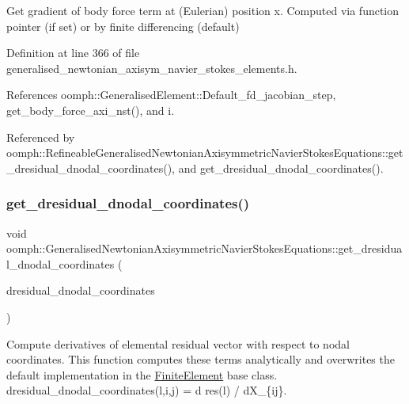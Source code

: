 Get gradient of body force term at (Eulerian) position x. Computed via function pointer (if set) or by finite differencing (default) 



Definition at line 366 of file generalised\+\_\+newtonian\+\_\+axisym\+\_\+navier\+\_\+stokes\+\_\+elements.\+h.



References oomph\+::\+Generalised\+Element\+::\+Default\+\_\+fd\+\_\+jacobian\+\_\+step, get\+\_\+body\+\_\+force\+\_\+axi\+\_\+nst(), and i.



Referenced by oomph\+::\+Refineable\+Generalised\+Newtonian\+Axisymmetric\+Navier\+Stokes\+Equations\+::get\+\_\+dresidual\+\_\+dnodal\+\_\+coordinates(), and get\+\_\+dresidual\+\_\+dnodal\+\_\+coordinates().

\mbox{\label{classoomph_1_1GeneralisedNewtonianAxisymmetricNavierStokesEquations_a741048e47acae2bdbda0cee6aaf0b4b0}} 
\subsubsection{\texorpdfstring{get\+\_\+dresidual\+\_\+dnodal\+\_\+coordinates()}{get\_dresidual\_dnodal\_coordinates()}}
{\footnotesize\ttfamily void oomph\+::\+Generalised\+Newtonian\+Axisymmetric\+Navier\+Stokes\+Equations\+::get\+\_\+dresidual\+\_\+dnodal\+\_\+coordinates (\begin{DoxyParamCaption}\item[{\hyperlink{classoomph_1_1RankThreeTensor}{Rank\+Three\+Tensor}$<$ double $>$ \&}]{dresidual\+\_\+dnodal\+\_\+coordinates }\end{DoxyParamCaption})\hspace{0.3cm}{\ttfamily [virtual]}}



Compute derivatives of elemental residual vector with respect to nodal coordinates. This function computes these terms analytically and overwrites the default implementation in the \hyperlink{classoomph_1_1FiniteElement}{Finite\+Element} base class. dresidual\+\_\+dnodal\+\_\+coordinates(l,i,j) = d res(l) / d\+X\+\_\+\{ij\}. 

